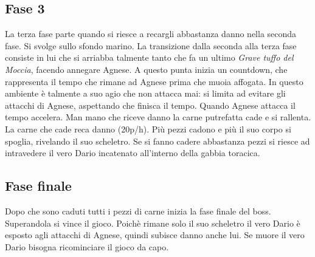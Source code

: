     \subsection{Fase 3}
        La terza fase parte quando si riesce a recargli abbastanza danno nella seconda fase. Si svolge sullo sfondo marino.
        La transizione dalla seconda alla terza fase consiste in lui che si arriabba talmente tanto che fa un ultimo 
        \emph{Grave tuffo del Moccia}, facendo annegare Agnese. A questo punta inizia un countdown, che rappresenta
        il tempo che rimane ad Agnese prima che muoia affogata. In questo ambiente è talmente a suo agio che non attacca mai:
        si limita ad evitare gli attacchi di Agnese, aspettando che finisca il tempo. Quando Agnese attacca il tempo accelera.
        Man mano che riceve danno la carne putrefatta cade e si rallenta. La carne che cade reca danno (20p/h). Più pezzi cadono
        e più il suo corpo si spoglia, rivelando il suo scheletro. Se si fanno cadere abbastanza pezzi si riesce ad intravedere
        il vero Dario incatenato all'interno della gabbia toracica.
    
    \subsection{Fase finale}
        Dopo che sono caduti tutti i pezzi di carne inizia la fase finale del boss. Superandola si vince il gioco. Poichè rimane
        solo il suo scheletro il vero Dario è esposto agli attacchi di Agnese, quindi subisce danno anche lui. Se muore il vero Dario
        bisogna ricominciare il gioco da capo.
        
